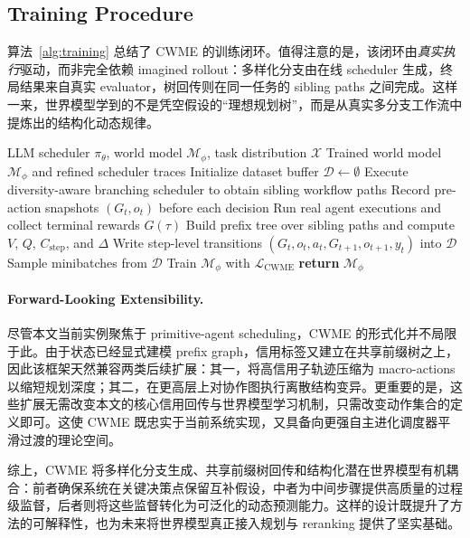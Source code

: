 \subsection{Training Procedure}

算法~\ref{alg:training} 总结了 CWME 的训练闭环。值得注意的是，该闭环由\emph{真实执行}驱动，而非完全依赖 imagined rollout：多样化分支由在线 scheduler 生成，终局结果来自真实 evaluator，树回传则在同一任务的 sibling paths 之间完成。这样一来，世界模型学到的不是凭空假设的“理想规划树”，而是从真实多分支工作流中提炼出的结构化动态规律。

\begin{algorithm}[t]
\caption{CWME Training Procedure}
\label{alg:training}
\begin{algorithmic}[1]
\REQUIRE LLM scheduler $\pi_\theta$, world model $\mathcal{M}_\phi$, task distribution $\mathcal{X}$
\ENSURE Trained world model $\mathcal{M}_\phi$ and refined scheduler traces
\STATE Initialize dataset buffer $\mathcal{D}\leftarrow \emptyset$
        \STATE Execute diversity-aware branching scheduler to obtain sibling workflow paths
        \STATE Record pre-action snapshots $(G_t,o_t)$ before each decision
        \STATE Run real agent executions and collect terminal rewards $G(\tau)$
        \STATE Build prefix tree over sibling paths and compute $V$, $Q$, $C_{\text{step}}$, and $\Delta$
        \STATE Write step-level transitions $\left(G_t,o_t,a_t,G_{t+1},o_{t+1},y_t\right)$ into $\mathcal{D}$
    \ENDFOR
    \STATE Sample minibatches from $\mathcal{D}$
    \STATE Train $\mathcal{M}_\phi$ with $\mathcal{L}_{\text{CWME}}$
\ENDFOR
\STATE \textbf{return} $\mathcal{M}_\phi$
\end{algorithmic}
\end{algorithm}

\paragraph{Forward-Looking Extensibility.}
尽管本文当前实例聚焦于 primitive-agent scheduling，CWME 的形式化并不局限于此。由于状态已经显式建模 prefix graph，信用标签又建立在共享前缀树之上，因此该框架天然兼容两类后续扩展：其一，将高信用子轨迹压缩为 macro-actions 以缩短规划深度；其二，在更高层上对协作图执行离散结构变异。更重要的是，这些扩展无需改变本文的核心信用回传与世界模型学习机制，只需改变动作集合的定义即可。这使 CWME 既忠实于当前系统实现，又具备向更强自主进化调度器平滑过渡的理论空间。

综上，CWME 将多样化分支生成、共享前缀树回传和结构化潜在世界模型有机耦合：前者确保系统在关键决策点保留互补假设，中者为中间步骤提供高质量的过程级监督，后者则将这些监督转化为可泛化的动态预测能力。这样的设计既提升了方法的可解释性，也为未来将世界模型真正接入规划与 reranking 提供了坚实基础。
